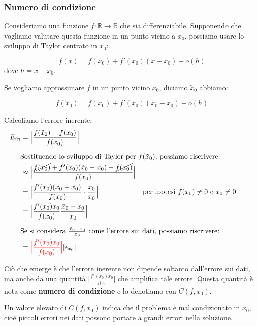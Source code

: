 \documentclass{article}
\newcommand{\alignedintertext}[1]{%
  \noalign{%
    \vskip\belowdisplayshortskip
    \vtop{\hsize=\linewidth#1\par
    \expandafter}%
    \expandafter\prevdepth\the\prevdepth
  }%
}
\begin{document}
\subsubsection{Numero di condizione}     
Consideriamo una funzione $f:\mathbb{R}\rightarrow \mathbb{R}$ che sia
\underline{differenziabile}. Supponendo che vogliamo valutare questa funzione in un
punto vicino a $x_0$, possiamo usare lo sviluppo di Taylor centrato in
$x_0$:

$$f(x)=f(x_0)+f'(x_0)(x-x_0)+o(h)$$
dove $h=x-x_0$.

Se vogliamo approssimare $f$ in un punto vicino $x_0$, diciamo
$\tilde{x}_0$ abbiamo:

$$f(\tilde{x}_0)=f(x_0)+f'(x_0)(\tilde{x}_0-x_0)+o(h)$$

Calcoliamo l'errore inerente:
\begin{equation*}
    \begin{aligned}
        E_{in}&= \Big\lvert \frac{f(\tilde{x}_0)-f(x_0)}{f(x_0)}\Big\rvert \\
            \alignedintertext{Sostituendo lo sviluppo di Taylor per
            $f(\tilde{x}_0)$, possiamo riscrivere:}
            &\approx \Big\lvert
            \frac{\cancel{f(x_0)}+f'(x_0)(\tilde{x}_0-x_0)-\cancel{f(x_0)}}{f(x_0)}\Big\rvert\\
            &=\Big\lvert
            \frac{f'(x_0)(\tilde{x}_0-x_0)}{f(x_0)}\cdot \frac{x_0}{x_0}\Big\rvert & \text{per ipotesi }
            f(x_0)\neq0 \text{ e }x_0\neq0\\ 
            &= \Big\lvert
            \frac{f'(x_0)x_0}{f(x_0)}\frac{\tilde{x}_0-x_0}{x_0}\Big\rvert\\ 
            \alignedintertext{Se si considera
            $\frac{\tilde{x}_0-x_0}{x_0}$ come 
            l'errore sui dati, possiamo riscrivere:}
            &= {\color{red}\Big\lvert \frac{f'(x_0)x_0}{f(x_0)}\Big\rvert} \lvert
            \epsilon_{x_0}\rvert
    \end{aligned}
\end{equation*}

Ciò che emerge è che l'errore inerente non dipende soltanto dall'errore sui
dati, ma anche da una quantità $\Big\lvert \frac{f'(x_0)x_0}{f(x_0}\Big\rvert$ che amplifica tale errore.
Questa quantità è nota come \textbf{numero di condizione} e lo denotiamo con
$C(f, x_0)$. 

Un valore elevato di $C(f, x_0)$ indica che il problema è mal condizionato in
$x_0$, cioè piccoli errori nei dati possono portare a grandi errori nella
soluzione.
\end{document}
